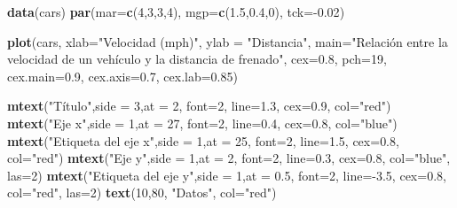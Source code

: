 \documentclass[]{article}
\newenvironment{Shaded}{\begin{snugshade}}{\end{snugshade}}
\newcommand{\KeywordTok}[1]{\textcolor[rgb]{0.13,0.29,0.53}{\textbf{{#1}}}}
\newcommand{\DataTypeTok}[1]{\textcolor[rgb]{0.13,0.29,0.53}{{#1}}}
\newcommand{\DecValTok}[1]{\textcolor[rgb]{0.00,0.00,0.81}{{#1}}}
\newcommand{\FloatTok}[1]{\textcolor[rgb]{0.00,0.00,0.81}{{#1}}}
\newcommand{\StringTok}[1]{\textcolor[rgb]{0.31,0.60,0.02}{{#1}}}
\newcommand{\NormalTok}[1]{{#1}}
\begin{document}
\begin{Shaded}
\begin{Highlighting}[]
\KeywordTok{data}\NormalTok{(cars)}
\KeywordTok{par}\NormalTok{(}\DataTypeTok{mar=}\KeywordTok{c}\NormalTok{(}\DecValTok{4}\NormalTok{,}\DecValTok{3}\NormalTok{,}\DecValTok{3}\NormalTok{,}\DecValTok{4}\NormalTok{), }\DataTypeTok{mgp=}\KeywordTok{c}\NormalTok{(}\FloatTok{1.5}\NormalTok{,}\FloatTok{0.4}\NormalTok{,}\DecValTok{0}\NormalTok{), }\DataTypeTok{tck=}\NormalTok{-}\FloatTok{0.02}\NormalTok{)}

\KeywordTok{plot}\NormalTok{(cars, }\DataTypeTok{xlab=}\StringTok{"Velocidad (mph)"}\NormalTok{, }\DataTypeTok{ylab =} \StringTok{"Distancia"}\NormalTok{, }
     \DataTypeTok{main=}\StringTok{"Relación entre la velocidad de un vehículo}
\StringTok{     y la distancia de frenado"}\NormalTok{, }\DataTypeTok{cex=}\FloatTok{0.8}\NormalTok{, }\DataTypeTok{pch=}\DecValTok{19}\NormalTok{, }\DataTypeTok{cex.main=}\FloatTok{0.9}\NormalTok{, }
     \DataTypeTok{cex.axis=}\FloatTok{0.7}\NormalTok{, }\DataTypeTok{cex.lab=}\FloatTok{0.85}\NormalTok{)}

\KeywordTok{mtext}\NormalTok{(}\StringTok{"Título"}\NormalTok{,}\DataTypeTok{side =} \DecValTok{3}\NormalTok{,}\DataTypeTok{at =} \DecValTok{2}\NormalTok{, }\DataTypeTok{font=}\DecValTok{2}\NormalTok{, }\DataTypeTok{line=}\FloatTok{1.3}\NormalTok{, }\DataTypeTok{cex=}\FloatTok{0.9}\NormalTok{, }\DataTypeTok{col=}\StringTok{"red"}\NormalTok{)}
\KeywordTok{mtext}\NormalTok{(}\StringTok{"Eje x"}\NormalTok{,}\DataTypeTok{side =} \DecValTok{1}\NormalTok{,}\DataTypeTok{at =} \DecValTok{27}\NormalTok{, }\DataTypeTok{font=}\DecValTok{2}\NormalTok{, }\DataTypeTok{line=}\FloatTok{0.4}\NormalTok{, }\DataTypeTok{cex=}\FloatTok{0.8}\NormalTok{, }\DataTypeTok{col=}\StringTok{"blue"}\NormalTok{)}
\KeywordTok{mtext}\NormalTok{(}\StringTok{"Etiqueta del eje x"}\NormalTok{,}\DataTypeTok{side =} \DecValTok{1}\NormalTok{,}\DataTypeTok{at =} \DecValTok{25}\NormalTok{, }\DataTypeTok{font=}\DecValTok{2}\NormalTok{, }\DataTypeTok{line=}\FloatTok{1.5}\NormalTok{, }\DataTypeTok{cex=}\FloatTok{0.8}\NormalTok{, }\DataTypeTok{col=}\StringTok{"red"}\NormalTok{)}
\KeywordTok{mtext}\NormalTok{(}\StringTok{"Eje y"}\NormalTok{,}\DataTypeTok{side =} \DecValTok{1}\NormalTok{,}\DataTypeTok{at =} \DecValTok{2}\NormalTok{, }\DataTypeTok{font=}\DecValTok{2}\NormalTok{, }\DataTypeTok{line=}\FloatTok{0.3}\NormalTok{, }\DataTypeTok{cex=}\FloatTok{0.8}\NormalTok{, }\DataTypeTok{col=}\StringTok{"blue"}\NormalTok{, }\DataTypeTok{las=}\DecValTok{2}\NormalTok{)}
\KeywordTok{mtext}\NormalTok{(}\StringTok{"Etiqueta del eje y"}\NormalTok{,}\DataTypeTok{side =} \DecValTok{1}\NormalTok{,}\DataTypeTok{at =} \FloatTok{0.5}\NormalTok{, }\DataTypeTok{font=}\DecValTok{2}\NormalTok{, }\DataTypeTok{line=}\NormalTok{-}\FloatTok{3.5}\NormalTok{, }\DataTypeTok{cex=}\FloatTok{0.8}\NormalTok{, }\DataTypeTok{col=}\StringTok{"red"}\NormalTok{, }\DataTypeTok{las=}\DecValTok{2}\NormalTok{)}
\KeywordTok{text}\NormalTok{(}\DecValTok{10}\NormalTok{,}\DecValTok{80}\NormalTok{, }\StringTok{"Datos"}\NormalTok{, }\DataTypeTok{col=}\StringTok{"red"}\NormalTok{)}
\end{Highlighting}
\end{Shaded}
\end{document}
